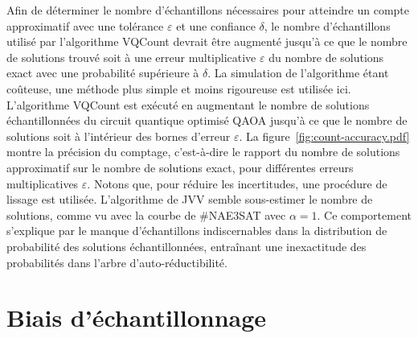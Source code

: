 Afin de déterminer le nombre d'échantillons nécessaires pour atteindre un compte approximatif avec une tolérance $\varepsilon$ et une confiance $\delta$, le nombre d'échantillons utilisé par l'algorithme VQCount devrait être augmenté jusqu'à ce que le nombre de solutions trouvé soit à une erreur multiplicative $\varepsilon$ du nombre de solutions exact avec une probabilité supérieure à $\delta$. La simulation de l'algorithme étant coûteuse, une méthode plus simple et moins rigoureuse est utilisée ici. L'algorithme VQCount est exécuté en augmentant le nombre de solutions échantillonnées du circuit quantique optimisé QAOA jusqu'à ce que le nombre de solutions soit à l'intérieur des bornes d'erreur $\varepsilon$. La figure~\ref{fig:count-accuracy.pdf} montre la précision du comptage, c'est-à-dire le rapport du nombre de solutions approximatif sur le nombre de solutions exact, pour différentes erreurs multiplicatives $\varepsilon$. Notons que, pour réduire les incertitudes, une procédure de lissage est utilisée. L'algorithme de JVV semble sous-estimer le nombre de solutions, comme vu avec la courbe de \#NAE3SAT avec $\alpha = 1$. Ce comportement s'explique par le manque d'échantillons indiscernables dans la distribution de probabilité des solutions échantillonnées, entraînant une inexactitude des probabilités dans l'arbre d'auto-réductibilité. 


\section{Biais d'échantillonnage}
\label{sec:biais-echantillonnage}

